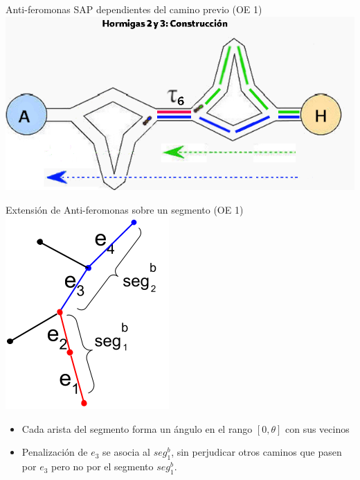 \begin{frame}{Anti-feromonas SAP dependientes del camino previo (OE 1)}
    \includegraphics[scale=0.51]{Pictures/ACO-ant-ferom-penalize-seg.png}
\end{frame}


\begin{frame}{Extensi\'on de Anti-feromonas sobre un segmento (OE 1)}
\centering
\includegraphics[scale=0.4]{Pictures/ant_segments_simple_case.png}
    \begin{itemize}
        \item Cada arista del segmento forma un \'angulo en el rango $[0, \theta]$ con sus vecinos
        \item Penalizaci\'on de $e_3$ se asocia al $seg^{b}_{1}$, sin perjudicar otros caminos que pasen por $e_3$ pero no por el segmento $seg^{b}_{1}$.
    \end{itemize}
\end{frame}

